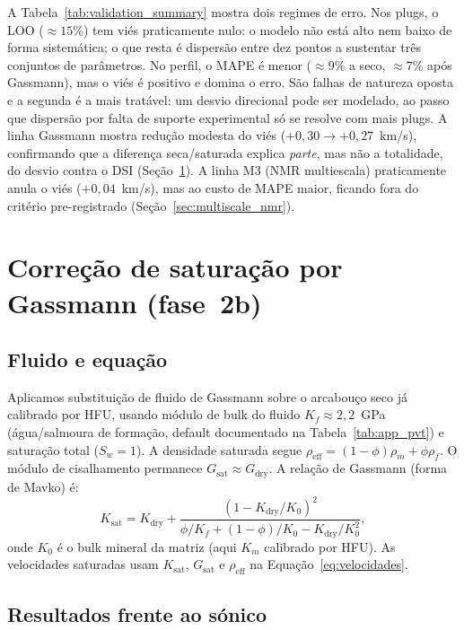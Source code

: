 \documentclass[11pt,a4paper]{article}
\numberwithin{equation}{section}
\begin{document}
A Tabela~\ref{tab:validation_summary} mostra dois regimes de erro.
Nos plugs, o LOO ($\approx 15\%$) tem viés praticamente nulo: o modelo
não está alto nem baixo de forma sistemática; o que resta é dispersão
entre dez pontos a sustentar três conjuntos de parâmetros.
No perfil, o MAPE é menor ($\approx 9\%$ a seco, $\approx 7\%$ após
Gassmann), mas o viés é positivo e domina o erro.
São falhas de natureza oposta e a segunda é a mais tratável: um desvio
direcional pode ser modelado, ao passo que dispersão por falta de suporte
experimental só se resolve com mais plugs.
A linha Gassmann mostra redução modesta do viés
($+0{,}30 \rightarrow +0{,}27$~km/s), confirmando que a diferença
seca/saturada explica \emph{parte}, mas não a totalidade, do desvio contra o
DSI (Seção~\ref{sec:gassmann}).
A linha M3 (NMR multiescala) praticamente anula o viés ($+0{,}04$~km/s), mas
ao custo de MAPE maior, ficando fora do critério pre-registrado
(Seção~\ref{sec:multiscale_nmr}).

\section{Correção de saturação por Gassmann (fase~2b)}
\label{sec:gassmann}

\subsection{Fluido e equação}

Aplicamos substituição de fluido de Gassmann sobre o arcabouço seco
já calibrado por HFU, usando módulo de bulk do fluido $K_f \approx 2{,}2$~GPa
(água/salmoura de formação, default documentado na Tabela~\ref{tab:app_pvt}) e saturação total
($S_w = 1$).
A densidade saturada segue $\rho_{\mathrm{eff}} = (1-\phi)\rho_m + \phi\rho_f$.
O módulo de cisalhamento permanece $G_{\mathrm{sat}} \approx G_{\mathrm{dry}}$.
A relação de Gassmann (forma de Mavko) é:
\begin{equation}
  \label{eq:gassmann}
  K_{\mathrm{sat}} = K_{\mathrm{dry}}
    + \frac{\left(1 - K_{\mathrm{dry}}/K_0\right)^2}
           {\phi/K_f + (1-\phi)/K_0 - K_{\mathrm{dry}}/K_0^2},
\end{equation}
onde $K_0$ é o bulk mineral da matriz (aqui $K_m$ calibrado por HFU).
As velocidades saturadas usam $K_{\mathrm{sat}}$, $G_{\mathrm{sat}}$ e
$\rho_{\mathrm{eff}}$ na Equação~\eqref{eq:velocidades}.

\subsection{Resultados frente ao sónico}
\end{document}
